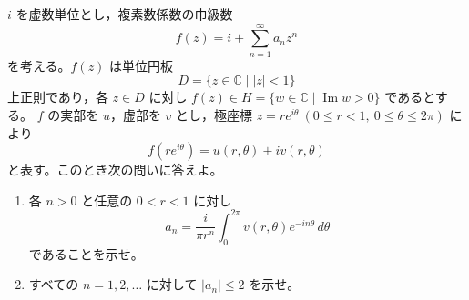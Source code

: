 \newcommand{\C}{\mathbb{C}}
\newcommand{\R}{\mathbb{R}}
\newcommand{\Z}{\mathbb{Z}}
\newcommand{\Tr}{\operatorname{Tr}}
\newcommand{\Impart}{\operatorname{Im}}
\newcommand{\AF}{\operatorname{AF}}
\newcommand{\AX}{\operatorname{AX}}
\newcommand{\GL}{\operatorname{GL}}


\(i\) を虚数単位とし，複素数係数の巾級数
\[
  f(z)=i+\sum_{n=1}^{\infty}a_n z^n
\]
を考える。\(f(z)\) は単位円板
\[
  D=\{z\in\C\mid |z|<1\}
\]
上正則であり，各 \(z\in D\) に対し \(f(z)\in H=\{w\in\C\mid \Impart w>0\}\) であるとする。
\(f\) の実部を \(u\)，虚部を \(v\) とし，極座標 \(z=re^{i\theta}\ (0\le r<1,\ 0\le \theta\le 2\pi)\) により
\[
  f(re^{i\theta})=u(r,\theta)+iv(r,\theta)
\]
と表す。このとき次の問いに答えよ。

\begin{enumerate}
  \item 各 \(n>0\) と任意の \(0<r<1\) に対し
  \[
    a_n=\frac{i}{\pi r^n}\int_{0}^{2\pi} v(r,\theta)e^{-in\theta}\,d\theta
  \]
  であることを示せ。
  \item すべての \(n=1,2,\ldots\) に対して \(|a_n|\le2\) を示せ。
\end{enumerate}

%